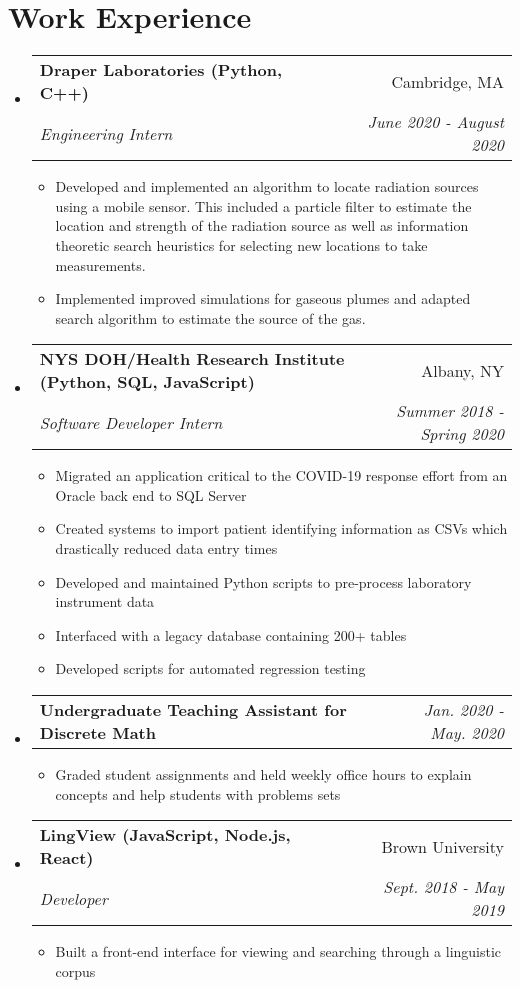 \documentclass[letterpaper,11pt]{article}
\makeatletter
\newcommand{\resumeItem}[2]{
  \item\small{
    \textbf{#1}{#2 \vspace{-2pt}}
  }
}
\newcommand{\resumeSubheading}[4]{
  \vspace{-1pt}\item
    \begin{tabular*}{0.97\textwidth}{l@{\extracolsep{\fill}}r}
      \textbf{#1} & #2 \\
      \textit{\small#3} & \textit{\small #4} \\
    \end{tabular*}\vspace{-5pt}
}
\newcommand{\resumeSubheadingSimple}[2]{
  \vspace{-1pt}\item
    \begin{tabular*}{0.97\textwidth}{l@{\extracolsep{\fill}}r}
      \textbf{#1} & \textit{\small#2}\\
    \end{tabular*}\vspace{-5pt}
}
\newcommand{\resumeSubHeadingListStart}{\begin{itemize}[leftmargin=*]}
\newcommand{\resumeSubHeadingListEnd}{\end{itemize}}
\newcommand{\resumeItemListStart}{\begin{itemize}}
\newcommand{\resumeItemListEnd}{\end{itemize}\vspace{-5pt}}
\makeatother
\begin{document}
\section{Work Experience}
  \resumeSubHeadingListStart
  \resumeSubheading{Draper Laboratories (Python, C++)}
    {Cambridge, MA}{Engineering Intern}{June 2020 - August 2020}
      \resumeItemListStart
        \resumeItem{}
        {Developed and implemented an algorithm to locate radiation sources using a mobile sensor. This included a particle filter to estimate the location and strength of the radiation source as well as information theoretic search heuristics for selecting new locations to take measurements.}
        \resumeItem{}
        {Implemented improved simulations for gaseous plumes and adapted search algorithm to estimate the source of the gas.}
      \resumeItemListEnd
      \resumeSubheading{NYS DOH/Health Research Institute (Python, SQL, JavaScript)}
    {Albany, NY}{Software Developer Intern}{Summer 2018 - Spring 2020}
      \resumeItemListStart
        \resumeItem{}
        {Migrated an application critical to the COVID-19 response effort from an Oracle back end to SQL Server}
        \resumeItem{}
        {Created systems to import patient identifying information as CSVs which drastically reduced data entry times}
        \resumeItem{}
        {Developed and maintained Python scripts to pre-process laboratory instrument data}
        \resumeItem{}
        {Interfaced with a legacy database containing 200+ tables}
        \resumeItem{}
        {Developed scripts for automated regression testing}
      \resumeItemListEnd
    \resumeSubheadingSimple{Undergraduate Teaching Assistant for Discrete Math}
    {Jan. 2020 - May. 2020}
      \resumeItemListStart
        \resumeItem{}
        {Graded student assignments and held weekly office hours to explain concepts and help students with problems sets}
        {}
      \resumeItemListEnd
    \resumeSubheading{LingView (JavaScript, Node.js, React)}{Brown University}{Developer}{Sept. 2018 - May 2019}
      \resumeItemListStart
        \resumeItem{}
        {Built a front-end interface for viewing and searching through a linguistic corpus}
      \resumeItemListEnd
  \resumeSubHeadingListEnd
\end{document}
